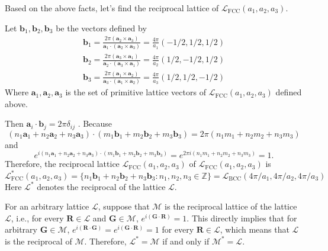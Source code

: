 \documentclass[a4paper,11pt]{article}
\begin{document}
Based on the above facts, let's find the reciprocal lattice of $\mathcal L_{\mathrm{FCC}}(a_1, a_2, a_3)$.

Let $\mathbf b_1, \mathbf b_2, \mathbf b_3$ be the vectors defined by
\begin{align}
    \mathbf b_1
    = \frac{2\pi (\mathbf a_2\times\mathbf a_3)}{\mathbf a_1\cdot(\mathbf a_2\times\mathbf a_3)}
    = \frac{4\pi}{a_1}(-1/2, 1/2, 1/2)\\
    \mathbf b_2
    = \frac{2\pi (\mathbf a_3\times\mathbf a_1)}{\mathbf a_2\cdot(\mathbf a_3\times\mathbf a_1)}
    = \frac{4\pi}{a_2}(1/2, -1/2, 1/2)\\
    \mathbf b_3
    = \frac{2\pi (\mathbf a_1\times\mathbf a_2)}{\mathbf a_3\cdot(\mathbf a_1\times\mathbf a_2)}
    = \frac{4\pi}{a_3}(1/2, 1/2, -1/2)
\end{align}
Where $\mathbf a_1, \mathbf a_2,\mathbf a_3$ is the set of primitive lattice vectors of $\mathcal L_{\mathrm{FCC}}(a_1, a_2, a_3)$ defined above.

Then $\mathbf a_i \cdot\mathbf b_j=2\pi \delta_{ij}$ . Because
\begin{equation}
    (n_1\mathbf a_1+n_2\mathbf a_2 + n_3\mathbf a_3) \cdot (m_1\mathbf b_1+m_2\mathbf b_2+m_3\mathbf b_3)=2\pi(n_1m_1+n_2m_2+n_3m_3)
\end{equation}
and
\begin{equation}
    e^{i(n_1\mathbf a_1+n_2\mathbf a_2 + n_3\mathbf a_3) \cdot (m_1\mathbf b_1+m_2\mathbf b_2+m_3\mathbf b_3)}=e^{2\pi i(n_1m_1+n_2m_2+n_3m_3)}=1.
\end{equation}
Therefore, the reciprocal lattice $\mathcal L_{\mathrm{FCC}}(a_1, a_2, a_3)$ of $\mathcal L_{\mathrm{FCC}}(a_1, a_2, a_3)$ is
\begin{equation}
    \mathcal L_{\mathrm{FCC}}^*(a_1, a_2, a_3)=\{n_1\mathbf b_1+n_2\mathbf b_2+n_3\mathbf b_3:n_1, n_2, n_3\in \mathbb Z\}=\mathcal L_{\mathrm{BCC}}(4\pi/a_1, 4\pi/a_2, 4\pi/a_3)
\end{equation}
Here $\mathcal L^*$ denotes the reciprocal of the lattice $\mathcal L$.

For an arbitrary lattice $\mathcal L$, suppose that $\mathcal M$ is the reciprocal lattice of the lattice $\mathcal L$, i.e., for every $\mathbf R\in\mathcal L$ and $\mathbf G\in\mathcal M$, $e^{i(\mathbf G\cdot\mathbf R)}=1$. This directly implies that for arbitrary $\mathbf G\in\mathcal M$, $e^{i(\mathbf R\cdot \mathbf G)}=e^{i(\mathbf G\cdot \mathbf R)}=1$ for every $\mathbf R\in\mathcal L$, which means that $\mathcal L$ is the reciprocal of $\mathcal M$. Therefore, $\mathcal L^*=\mathcal M$ if and only if $\mathcal M^*=\mathcal L$. 
\end{document}
